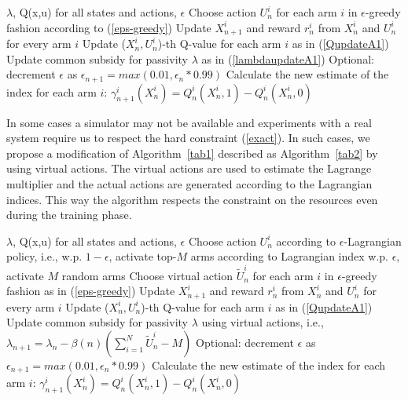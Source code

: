 \documentclass[12pt]{article}
\numberwithin{equation}{section}
\newcommand{\1}{\textbf{1}}
\begin{document}
\begin{algorithm}[H] 
\caption{RL for Lagrangian index with relaxed constraint}
\label{tab1}
\begin{algorithmic}[1]
     $\lambda$, Q(x,u) for all states and actions, $\epsilon$
        \State Choose action $U_{n}^i$ for each arm $i$ in $\epsilon$-greedy fashion according to (\ref{eps-greedy})
        \State Update $X_{n+1}^i$ and reward $r_n^i$ from $X_{n}^i$ and $U_{n}^i$ for every arm $i$
        \State Update ($X_n^i, U_n^i$)-th Q-value for each arm $i$ as in (\ref{QupdateA1})
        \State Update common subsidy for passivity $\lambda$ as in (\ref{lambdaupdateA1})
        \State Optional: decrement $\epsilon$ as $\epsilon_{n+1}=max(0.01,\epsilon_{n}*0.99)$
    \EndFor
    \State Calculate the new estimate of the index for each arm $i$:
        \Statex\hspace*{5mm} $\gamma^i_{n+1}(X^i_n)=Q^i_n(X^i_n,1)-Q^i_n(X^i_n,0)$
\end{algorithmic}
\end{algorithm}

In some cases a simulator may not be available and experiments with a real system require us 
to respect the hard constraint (\ref{exact}). In such cases, we propose a modification 
of Algorithm~\ref{tab1} described as Algorithm~\ref{tab2} by using virtual actions. The virtual actions 
are used to estimate the Lagrange multiplier and the actual actions are generated according 
to the Lagrangian indices. This way the algorithm respects the constraint on the resources
even during the training phase.

\begin{algorithm}[H] 
\caption{RL for Lagrangian index with hard constraint}
\label{tab2}
\begin{algorithmic}[1]
     $\lambda$, Q(x,u) for all states and actions, $\epsilon$
        \State Choose action $U_{n}^i$ according to $\epsilon$-Lagrangian policy, i.e.,
        \Statex\hspace*{5mm} w.p. $1-\epsilon$, activate top-$M$ arms according to Lagrangian index
        \Statex\hspace*{5mm} w.p. $\epsilon$, activate $M$ random arms
        \State Choose virtual action $\tilde{U}_{n}^i$ for each arm $i$ in $\epsilon$-greedy fashion as in (\ref{eps-greedy})
        \State Update $X_{n+1}^i$ and reward $r_n^i$ from $X_{n}^i$ and $U_{n}^i$ for every arm $i$
        \State Update ($X_n^i, U_n^i$)-th Q-value for each arm $i$ as in (\ref{QupdateA1})
        \State Update common subsidy for passivity $\lambda$ using virtual actions, i.e., 
        \Statex\hspace*{5mm} $\lambda_{n+1} = \lambda_n - \beta(n) \left(\sum_{i=1}^{N}\tilde{U}^i_n-M\right)$
        \State Optional: decrement $\epsilon$ as $\epsilon_{n+1}=max(0.01,\epsilon_{n}*0.99)$
    \EndFor
    \State Calculate the new estimate of the index for each arm $i$:
        \Statex\hspace*{5mm} $\gamma^i_{n+1}(X^i_n)=Q^i_n(X^i_n,1)-Q^i_n(X^i_n,0)$
\end{algorithmic}
\end{algorithm}
\end{document}
